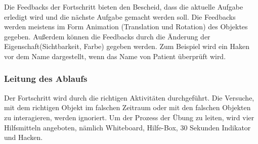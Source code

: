   Die Feedbacks der Fortschritt bieten den Bescheid, dass die aktuelle Aufgabe erledigt wird und die nächste Aufgabe gemacht werden soll. Die Feedbacks werden meistens im Form Animation (Translation und Rotation) des Objektes gegeben. Außerdem können die Feedbacks durch die Änderung der Eigenschaft(Sichtbarkeit, Farbe) gegeben werden. Zum Beispiel wird ein Haken vor dem Name dargestellt, wenn das Name von Patient überprüft wird.
  
  \subsubsection{Leitung des Ablaufs}
  Der Fortschritt wird durch die richtigen Aktivitäten durchgeführt. Die Versuche, mit dem richtigen Objekt im falschen Zeitraum oder mit den falschen Objekten zu interagieren, werden ignoriert. Um der Prozess der Übung zu leiten, wird vier Hilfsmitteln angeboten, nämlich Whiteboard, Hilfe-Box, 30 Sekunden Indikator und Hacken.
